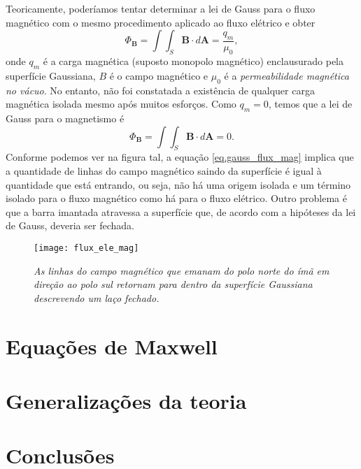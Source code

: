 Teoricamente, poderíamos tentar determinar a lei de Gauss para o fluxo magnético com o mesmo procedimento aplicado ao fluxo elétrico e obter
\begin{equation*}
\Phi_\textbf{B}=\int\int_S\textbf{B}\cdot\textit{d}\textbf{A}=\frac{q_m}{\mu_0},
\end{equation*} 
onde $q_m$ é a carga magnética (suposto monopolo magnético) enclausurado pela superfície Gaussiana, $B$ é o campo magnético e $\mu_0$ é a \textit{permeabilidade magnética no vácuo}. No entanto, não foi constatada a existência de qualquer carga magnética isolada mesmo após muitos esforços. Como $q_m=0$, temos que a lei de Gauss para o magnetismo é
\begin{equation}\label{eq.gauss_flux_mag}
\Phi_\textbf{B}=\int\int_S\textbf{B}\cdot\textit{d}\textbf{A}=0.
\end{equation}
Conforme podemos ver na figura tal, a equação \ref{eq.gauss_flux_mag} implica que a quantidade de linhas do campo magnético saindo da superfície é igual à quantidade que está entrando, ou seja, não há uma origem isolada e um término isolado para o fluxo magnético como há para o fluxo elétrico. Outro problema é que a barra imantada atravessa a superfície que, de acordo com a hipóteses da lei de Gauss, deveria ser fechada.
\begin{figure}[!htb]
\centering
\texttt{[image: flux\_ele\_mag]}
\caption{\textit{As linhas do campo magnético que emanam do polo norte do ímã em direção ao polo sul retornam para dentro da superfície Gaussiana descrevendo um laço fechado.}}
\label{fig.flux_elet_magn}
\end{figure}




\section{Equações de Maxwell}

\section{Generalizações da teoria}

\section{Conclusões}